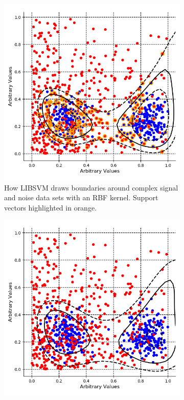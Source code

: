 \begin{figure}[H]
\centering
\begin{subfigure}{.5\textwidth}
  \centering
  \includegraphics[width=\linewidth]{Chapter4/Figs/Raster/svmLinAndRbf/svmExp_2GaussExample.png}
  \captionsetup{width=.9\linewidth}
  \caption{How LIBSVM draws boundaries around complex signal and noise data sets with an RBF kernel. Support vectors highlighted in orange.}
  \label{subFig:svmExp_2GausseExample}
\end{subfigure}%
\begin{subfigure}{.5\textwidth}
  \centering
  \includegraphics[width=\linewidth]{Chapter4/Figs/Raster/svmLinAndRbf/exp_2NysGaussExample.png}

\end{subfigure}
\end{figure}
